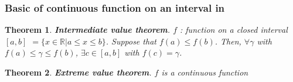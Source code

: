 \documentclass[a4paper,10pt]{article}
\newtheorem{theo}{Theorem}[]
\begin{document}
\subsubsection{Basic of continuous function on an interval in }

\begin{theo}
	\textbf{Intermediate value theorem}. $ f $ : function on a closed interval $ [a,b] $ $ = \{ x \in \mathbb{R} | a \leq x \leq b \} $. Suppose that $ f(a) \leq f(b) $. Then, $ \forall \gamma $ with $ f(a) \leq \gamma \leq f(b) $, $ \exists c \in [a,b] $ with $ f(c)=\gamma $.
\end{theo}

\begin{theo}
	\textbf{Extreme value theorem}. $ f $ is a continuous function
\end{theo}
\end{document}
